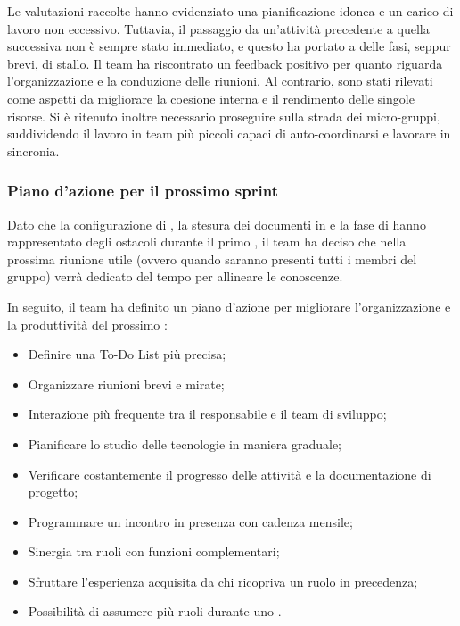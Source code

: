 \vspace{0.5\baselineskip}
\par Le valutazioni raccolte hanno evidenziato una pianificazione idonea e un carico di lavoro non eccessivo. Tuttavia, il passaggio da un'attività precedente a quella successiva non è sempre stato immediato, e questo ha portato a delle fasi, seppur brevi, di stallo. Il team ha riscontrato un feedback positivo per quanto riguarda l'organizzazione e la conduzione delle riunioni. Al contrario, sono stati rilevati come aspetti da migliorare la coesione interna e il rendimento delle singole risorse. Si è ritenuto inoltre necessario proseguire sulla strada dei micro-gruppi, suddividendo il lavoro in team più piccoli capaci di auto-coordinarsi e lavorare in sincronia.

\subsubsection{Piano d'azione per il prossimo sprint}
\par Dato che la configurazione di , la stesura dei documenti in  e la fase di  hanno rappresentato degli ostacoli durante il primo , il team ha deciso che nella prossima riunione utile (ovvero quando saranno presenti tutti i membri del gruppo) verrà dedicato del tempo per allineare le conoscenze.
\par In seguito, il team ha definito un piano d'azione per migliorare l'organizzazione e la produttività del prossimo :
\begin{itemize}
  \item Definire una To-Do List più precisa;
  \item Organizzare riunioni brevi e mirate;
  \item Interazione più frequente tra il responsabile e il team di sviluppo;
  \item Pianificare lo studio delle tecnologie in maniera graduale;
  \item Verificare costantemente il progresso delle attività e la documentazione di progetto;
  \item Programmare un incontro in presenza con cadenza mensile;
  \item Sinergia tra ruoli con funzioni complementari;
  \item Sfruttare l'esperienza acquisita da chi ricopriva un ruolo in precedenza;
  \item Possibilità di assumere più ruoli durante uno .
\end{itemize}

